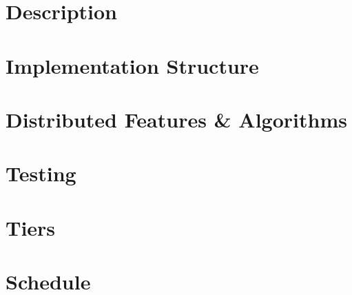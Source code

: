 \documentclass[12pt]{article}
\begin{document}
\maketitle

\section{Description}


\section{Implementation Structure}


\section{Distributed Features \& Algorithms}


\section{Testing}


\section{Tiers}


\section{Schedule}
\end{document}
